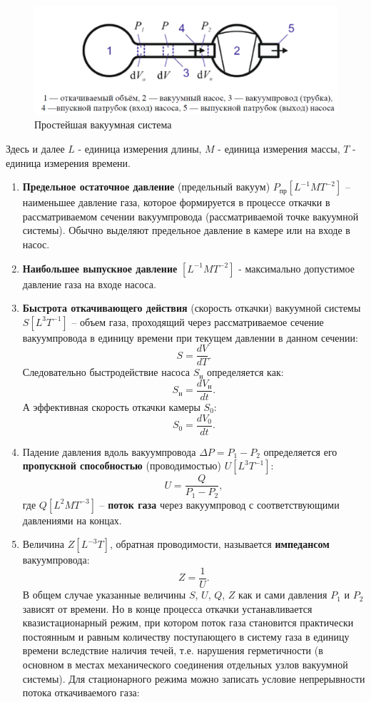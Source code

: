 \documentclass[a4paper, 12pt]{article}
\begin{document}
\begin{figure}[h!]
\includegraphics[width = \textwidth]{2.png}
\caption{Простейшая вакуумная система}
\label{ris2}
\end{figure}
Здесь и далее $L$ - единица измерения длины, $M$ - единица измерения массы, $T$ - единица измерения времени.
\begin{enumerate}
\item \textbf{Предельное остаточное давление} (предельный вакуум) $P_{\text{пр}} [L^{-1}MT^{-2}]$ -- наименьшее давление газа, которое формируется в процессе откачки в рассматриваемом сечении вакуумпровода (рассматриваемой точке вакуумной системы). Обычно выделяют предельное давление в камере или на входе в насос.
\item \textbf{Наибольшее выпускное давление} $[L^{-1}MT^{-2}]$ - максимально допустимое давление газа на входе насоса.
\item \textbf{Быстрота откачивающего действия} (скорость откачки) вакуумной системы $S [L^3T^{-1}]$ -- объем газа, проходящий через рассматриваемое сечение вакуумпровода в единицу времени при текущем давлении в данном сечении:
\[S = \dfrac{dV}{dT}.\]
Следовательно быстродействие насоса $S_{\text{н}}$ определяется как:
\[ S_{ \text{н} } = \dfrac{dV_{ \text{н} }}{ dt }.\]
А эффективная скорость откачки камеры $S_0$:
\[S_0 = \dfrac{ dV_0 }{ dt }.\]
\item Падение давления вдоль вакуумпровода $ \Delta P = P_1 - P_2 $ определяется его \textbf{пропускной способностью} (проводимостью) $ U [L^3 T^{-1} ] $:
\[ U = \dfrac{Q}{P_1 - P_2}, \]
где $Q [L^2 M T^{-3}]$ -- \textbf{поток газа} через вакуумпровод с соответствующими давлениями на концах.
\item Величина $Z [L^{-3}T]$, обратная проводимости, называется \textbf{импедансом} вакуумпровода:
\[Z=\dfrac{1}{U}.\]
В общем случае указанные величины $S$, $U$, $Q$, $Z$ как и сами давления $P_1$ и $P_2$ зависят от времени. Но в конце процесса откачки устанавливается квазистационарный режим, при котором поток газа становится практически постоянным и равным количеству поступающего в систему газа в единицу времени вследствие наличия течей, т.е. нарушения герметичности (в основном в местах механического соединения отдельных узлов вакуумной системы). Для стационарного режима можно записать условие непрерывности потока откачиваемого газа:

\end{enumerate}
\end{document}
